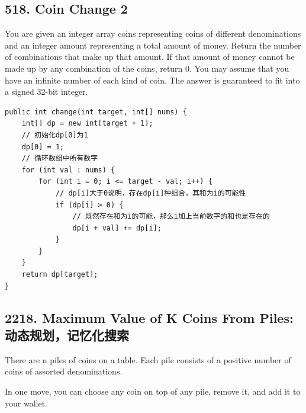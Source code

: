 \documentclass[9pt, b5paaper]{book}
\begin{document}
\subsection{518. Coin Change 2}
\label{sec-1-1-2}
You are given an integer array coins representing coins of different denominations and an integer amount representing a total amount of money.
Return the number of combinations that make up that amount. If that amount of money cannot be made up by any combination of the coins, return 0.
You may assume that you have an infinite number of each kind of coin.
The answer is guaranteed to fit into a signed 32-bit integer.
\begin{verbatim}
public int change(int target, int[] nums) {
    int[] dp = new int[target + 1];
    // 初始化dp[0]为1
    dp[0] = 1;
    // 循环数组中所有数字
    for (int val : nums) {
        for (int i = 0; i <= target - val; i++) {
            // dp[i]大于0说明，存在dp[i]种组合，其和为i的可能性
            if (dp[i] > 0) {
                // 既然存在和为i的可能，那么i加上当前数字的和也是存在的
                dp[i + val] += dp[i];
            }
        }
    }
    return dp[target];
}
\end{verbatim}
\subsection{2218. Maximum Value of K Coins From Piles: 动态规划，记忆化搜索}
\label{sec-1-1-3}
There are n piles of coins on a table. Each pile consists of a positive number of coins of assorted denominations.

In one move, you can choose any coin on top of any pile, remove it, and add it to your wallet.
\end{document}
